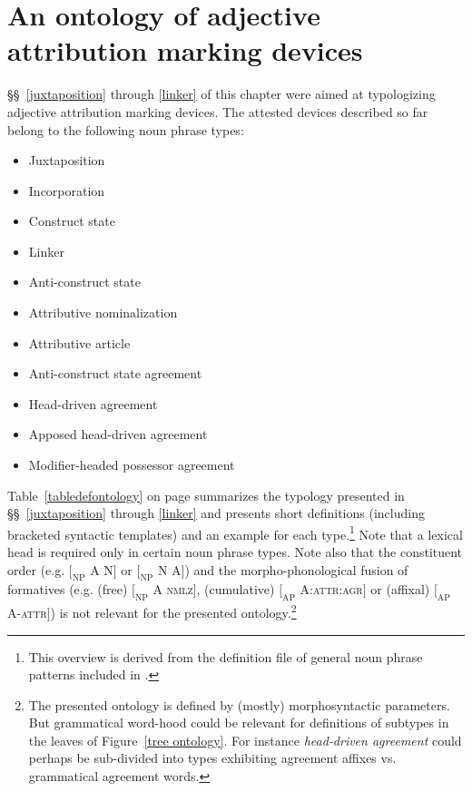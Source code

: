 \section[Ontology of attribution marking]{An ontology of adjective attribution marking devices}\label{ontol}
\S\S~\ref{juxtaposition} through \ref{linker} of this chapter were aimed at typologizing adjective attribution marking devices. The attested devices described so far belong to the following noun phrase types:
\begin{itemize}
\item{Juxtaposition}
\item{Incorporation}
\item{Construct state}
\item{Linker}
\item{Anti\hyp{}construct state}
\item{Attributive nominalization}
\item{Attributive article}
\item{Anti\hyp{}construct state agreement}
\item{Head\hyp{}driven agreement}
\item{Apposed head\hyp{}driven agreement}%
\item{Modifier\hyp{}headed possessor agreement}
\end{itemize}
Table~\ref{tabledefontology} on page \pageref{tabledefontology} summarizes the typology presented in \S\S~\ref{juxtaposition} through \ref{linker} and presents short definitions (including bracketed syntactic templates) and an example for each type.\footnote{This overview is derived from the definition file of general noun phrase patterns included in \citet{AUTOTYP-NP}.} Note that a lexical head is required only in certain noun phrase types. Note also that the constituent order (e.g. $[_\textrm{NP}$ A N$]$ or $[_\textrm{NP}$ N A$]$) and the morpho-phonological fusion of formatives (e.g. (free) $[_\textrm{NP}$ A \textsc{nmlz}$]$, (cumulative) $[_\textrm{AP}$ A:\textsc{attr:agr}$]$ or (affixal) $[_\textrm{AP}$ A-\textsc{attr}$]$) is not relevant for the presented ontology.\footnote{The presented ontology is defined by (mostly) morphosyntactic parameters. But grammatical word-hood could be relevant for definitions of subtypes in the leaves of Figure~\ref{tree ontology}. For instance \textit{head\hyp{}driven agreement} could perhaps be sub-divided into types exhibiting agreement affixes vs. grammatical agreement words.}

